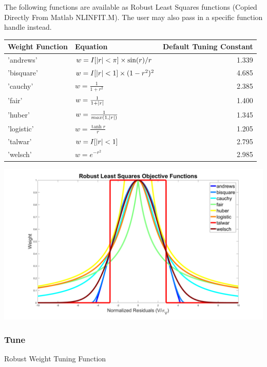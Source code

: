 \documentclass{article}
\DeclarePairedDelimiter\abs{\lvert}{\rvert}%
\begin{document}
	The following functions are available as Robust Least Squares functions (Copied Directly From Matlab NLINFIT.M).  The user may also pass in a specific function handle instead.  
	\begin{table}[H]
		\begin{tabular}{llr}
			\toprule
			Weight Function & Equation                              & Default Tuning Constant \\
			\midrule
			'andrews'       & $w=I[\abs{r} < \pi] \times \sin(r)/r$ &                   1.339 \\
			'bisquare'      & $w=I[\abs{r}<1] \times (1-r^2)^2 $    &                   4.685 \\
			'cauchy'        & $w=\frac{1}{1+r^2} $                  &                   2.385 \\
			'fair'          & $w=\frac{1}{1+\abs{r}}$               &                   1.400 \\
			'huber'         & $w=\frac{1}{max(1,\abs{r})}$          &                   1.345 \\
			'logistic'      & $w=\frac{\tanh{r}}{r}$                &                   1.205 \\
			'talwar'        & $w=I[\abs{r}<1]         $             &                   2.795 \\
			'welsch'        & $w=e^{-r^2}$                          &                   2.985 \\
			\bottomrule
		\end{tabular}
	\end{table}
	\includegraphics[width = \linewidth]{RobustFunctions}
	
	\subsubsection{Tune}
	Robust Weight Tuning Function
	
\end{document}

